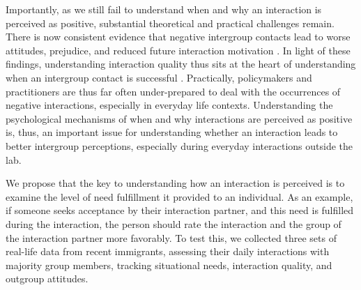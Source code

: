 \documentclass[man, 12pt, a4paper, mask]{apa7}
\theoremstyle{break}
\theoremstyle{plain}
\begin{document}
Importantly, as we still fail to understand when and why an interaction is perceived as positive, substantial theoretical and practical challenges remain. There is now consistent evidence that negative intergroup contacts lead to worse attitudes, prejudice, and reduced future interaction motivation \citep[e.g.,][]{Barlow2012, Prati2021, Graf2014}. In light of these findings, understanding interaction quality thus sits at the heart of understanding when an intergroup contact is successful \citep[e.g.,][]{Allport1954b, Brown2007, Tropp2016}. Practically, policymakers and practitioners are thus far often under-prepared to deal with the occurrences of negative interactions, especially in everyday life contexts. Understanding the psychological mechanisms of when and why interactions are perceived as positive is, thus, an important issue for understanding whether an interaction leads to better intergroup perceptions, especially during everyday interactions outside the lab.

We propose that the key to understanding how an interaction is perceived is to examine the level of need fulfillment it provided to an individual. As an example, if someone seeks acceptance by their interaction partner, and this need is fulfilled during the interaction, the person should rate the interaction and the group of the interaction partner more favorably. To test this, we collected three sets of real-life data from recent immigrants, assessing their daily interactions with majority group members, tracking situational needs, interaction quality, and outgroup attitudes. 
\end{document}
